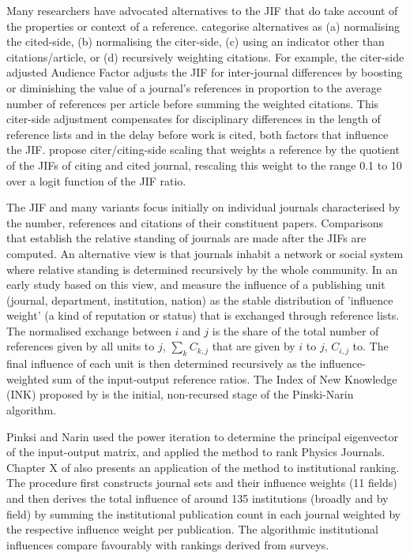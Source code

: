 \documentclass[10pt]{article}
\begin{document}
Many researchers have advocated alternatives to the JIF that do take account of the properties or context of a reference. \cite{waltmanRelationEigenfactorAudience2010} categorise alternatives as (a) normalising the cited-side, (b) normalising the citer-side, (c) using an indicator other than citations/article, or (d) recursively weighting citations. For example, the citer-side adjusted Audience Factor \citep{zitt2008} adjusts the JIF for inter-journal differences by boosting or diminishing the value of a journal's references in proportion to the average number of references per article before summing the weighted citations. This citer-side adjustment compensates for disciplinary differences in the length of reference lists and in the delay before work is cited, both factors that influence the JIF. \cite{habibzadehJournalWeightedImpact2008} propose citer/citing-side scaling that weights a reference by the quotient of the JIFs of citing and cited journal, rescaling this weight to the range 0.1 to 10 over a logit function of the JIF ratio. 

The JIF and many variants focus initially on individual journals characterised by the number, references and citations of their constituent papers. Comparisons that establish the relative standing of journals are made after the JIFs are computed. An alternative view is that journals inhabit a network or social system where relative standing is determined recursively by the whole community. In an early study based on this view, \cite{narinEVALUATIVEBIBLIOMETRICSUSE1976} and \cite{pinski} measure the influence of a publishing unit (journal, department, institution, nation) as the stable distribution of 'influence weight' (a kind of reputation or status) that is exchanged through reference lists. The normalised exchange between $i$ and $j$ is the share of the total number of references given by all units to $j$, $\sum_k C_{k,j}$ that are given by $i$ to $j$, $C_{i,j}$ to. The final influence of each unit is then determined recursively as the influence-weighted sum of the input-output reference ratios. The Index of New Knowledge (INK) proposed by \cite{paulyReinterpretation145influenceWeight1462008} is the initial, non-recursed stage of the Pinski-Narin algorithm.

Pinksi and Narin used the power iteration to determine the principal eigenvector of the input-output matrix, and applied the method to rank Physics Journals. Chapter X of \cite{narinEVALUATIVEBIBLIOMETRICSUSE1976} also presents an application of the method to institutional ranking. The procedure first constructs journal sets and their influence weights (11 fields) and then derives the total influence of around 135 institutions (broadly and by field) by summing the institutional publication count in each journal weighted by the respective influence weight per publication. The algorithmic institutional influences compare favourably with rankings derived from surveys.
\end{document}
